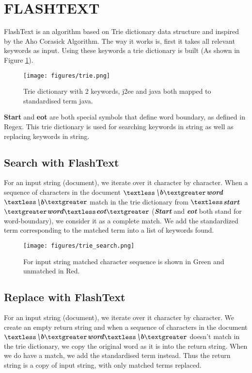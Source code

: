 \section{FLASHTEXT}
FlashText is an algorithm based on Trie dictionary data structure and inspired by the Aho Corasick Algorithm. The way it works is, first it takes all relevant keywords as input. Using these keywords a trie dictionary is built (As shown in Figure \ref{fig:trie}).

\begin{figure}[H]
    \centering
    \texttt{[image: figures/trie.png]}
    \caption{Trie dictionary with 2 keywords, j2ee and java both mapped to standardised term java.}
    \label{fig:trie}
\end{figure}

\textbf{Start} and \textbf{eot} are both special symbols that define word boundary, as defined in Regex. This trie dictionary is used for searching keywords in string as well as replacing keywords in string.

\subsection{Search with FlashText}

For an input string (document), we iterate over it character by character. When a sequence of characters in the document \textbf{\textit{$\textless$\textbackslash b$\textgreater$word$\textless$\textbackslash b$\textgreater$}} match in the trie dictionary from \textbf{\textit{$\textless$start$\textgreater$word$\textless$eot$\textgreater$}} (\textbf{\textit{Start}} and \textbf{\textit{eot}} both stand for word-boundary), we consider it as a complete match. We add the standardized term corresponding to the matched term into a list of keywords found.


\begin{figure}[H]
    \centering
    \texttt{[image: figures/trie\_search.png]}
    \caption{For input string matched character sequence is shown in Green and unmatched in Red.}
    \label{fig:trie_search}
\end{figure}

\subsection{Replace with FlashText}

For an input string (document), we iterate over it character by character. We create an empty return string and when a sequence of characters in the document \textbf{\textit{$\textless$\textbackslash b$\textgreater$word$\textless$\textbackslash b$\textgreater$}} doesn’t match in the trie dictionary, we copy the original word as it is into the return string. When we do have a match, we add the standardised term instead. Thus the return string is a copy of input string, with only matched terms replaced.

